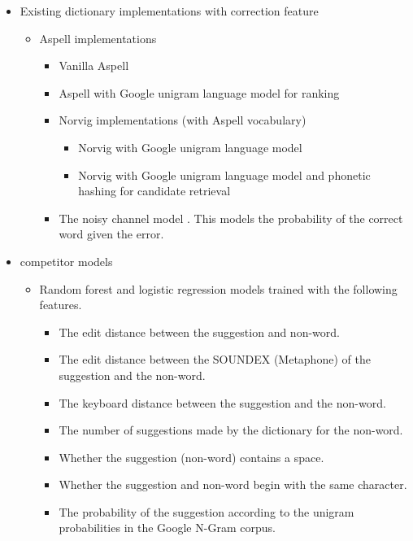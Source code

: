 \begin{itemize}
        \begin{itemize}
        \item Existing dictionary implementations with correction feature 
            \begin{itemize}
                \item Aspell implementations
                    \begin{itemize}
                    \item Vanilla Aspell 
                    \item Aspell with Google unigram language model for ranking 
                \item Norvig implementations (with Aspell vocabulary)
                    \begin{itemize}
                    \item Norvig with Google unigram language model
                    \item Norvig with Google unigram language model and phonetic hashing for candidate retrieval 
                    \end{itemize}
                \item  The noisy channel model \cite{kernighan1990spelling, church1991probability}.  This models the probability of the correct word given the error. 
            \end{itemize}
        \end{itemize}
    \item competitor models
        \begin{itemize}
            \item Random forest and logistic regression models trained with the following features.
                \begin{itemize}
                    \item The edit distance between the suggestion and non-word.
                    \item The edit distance between the SOUNDEX (Metaphone) of the suggestion and the non-word.
                    \item The keyboard distance between the suggestion and the non-word.
                    \item The number of suggestions made by the dictionary for the non-word.
                    \item Whether the suggestion (non-word) contains a space.
                    \item Whether the suggestion and non-word begin with the same character.
                    \item The probability of the suggestion according to the unigram probabilities in the Google N-Gram corpus.

\end{itemize}
\end{itemize}
\end{itemize}
\end{itemize}
